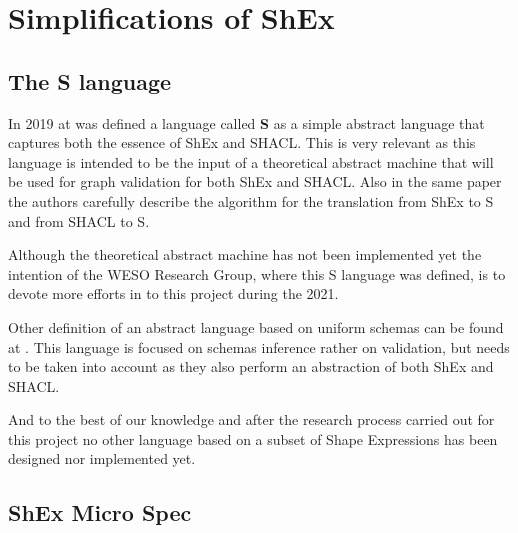 \section{Simplifications of ShEx}

\subsection{The \textbf{S} language}

In 2019 at  was defined a language called \textbf{S} as a simple abstract language that captures both the essence of ShEx and SHACL. This is very relevant as this language is intended to be the input of a theoretical abstract machine that will be used for graph validation for both ShEx and SHACL. Also in the same paper the authors carefully describe the algorithm for the translation from ShEx to S and from SHACL to S.

Although the theoretical abstract machine has not been implemented yet the intention of the WESO Research Group, where this S language was defined, is to devote more efforts in to this project during the 2021.

Other definition of an abstract language based on uniform schemas can be found at . This language is focused on schemas inference rather on validation, but needs to be taken into account as they also perform an abstraction of both ShEx and SHACL.

And to the best of our knowledge and after the research process carried out for this project no other language based on a subset of Shape Expressions has been designed nor implemented yet.

\subsection{ShEx Micro Spec}